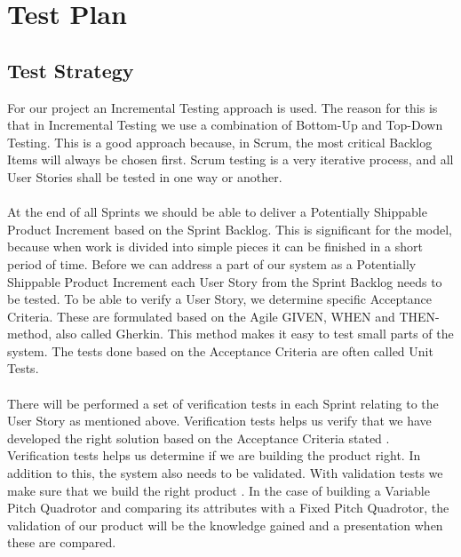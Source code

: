 \section{Test Plan}
\subsection{Test Strategy}
For our project an Incremental Testing approach is used. The reason for this is that in Incremental Testing we use a combination of Bottom-Up and Top-Down Testing. This is a good approach because, in Scrum, the most critical Backlog Items will always be chosen first. Scrum testing is a very iterative process, and all User Stories shall be tested in one way or another.\\
\\
At the end of all Sprints we should be able to deliver a Potentially Shippable Product Increment based on the Sprint Backlog. This is significant for the model, because when work is divided into simple pieces it can be finished in a short period of time. Before we can address a part of our system as a Potentially Shippable Product Increment each User Story from the Sprint Backlog needs to be tested. To be able to verify a User Story, we determine specific Acceptance Criteria. These are formulated based on the Agile GIVEN, WHEN and THEN-method, also called Gherkin. This method makes it easy to test small parts of the system. The tests done based on the Acceptance Criteria are often called Unit Tests.\\
\\
There will be performed a set of verification tests in each Sprint relating to the User Story as mentioned above. Verification tests helps us verify that we have developed the right solution based on the Acceptance Criteria stated \cite{ref1}. Verification tests helps us determine if we are building the product right. In addition to this, the system also needs to be validated. With validation tests we make sure that we build the right product \cite{ref5}. In the case of building a Variable Pitch Quadrotor and comparing its attributes with a Fixed Pitch Quadrotor, the validation of our product will be the knowledge gained and a presentation when these are compared. \\
\\
\newpage

